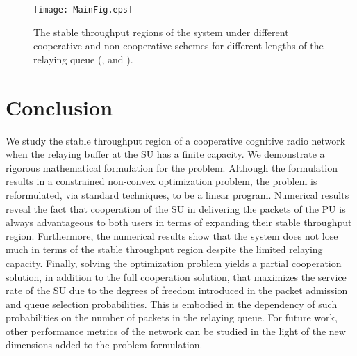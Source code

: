 \documentclass[conference]{IEEEtran}
\begin{document}
\begin{figure}
\centering
\texttt{[image: MainFig.eps]}
\caption{The stable throughput regions of the system under different cooperative and non-cooperative schemes for different lengths of the relaying queue  (,  and ).}
\label{fig:throughout}
\end{figure}

\section{Conclusion}
We study the stable throughput region of a cooperative cognitive radio network when the relaying buffer at the SU has a finite capacity. We demonstrate a rigorous mathematical formulation for the problem. Although the formulation results in a constrained non-convex optimization problem, the problem is reformulated, via standard techniques, to be a linear program. Numerical results reveal the fact that cooperation of the SU in delivering the packets of the PU is always advantageous to both users in terms of expanding their stable throughput region. Furthermore, the numerical results show that the system does not lose much in terms of the stable throughput region despite the limited relaying capacity. Finally, solving the optimization problem yields a partial cooperation solution, in addition to the full cooperation solution, that maximizes the service rate of the SU due to the degrees of freedom introduced in the packet admission and queue selection probabilities. This is embodied in the dependency of such probabilities on the number of packets in the relaying queue. For future work, other performance metrics of the network can be studied in the light of the new dimensions added to the problem formulation.









\linespread{1}

\end{document}
